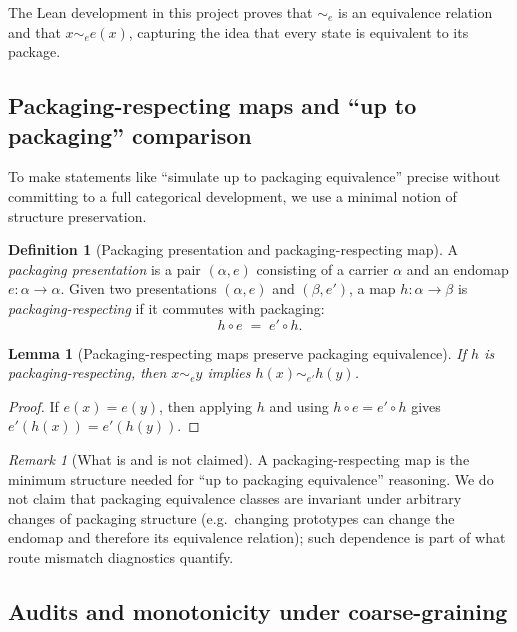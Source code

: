 \documentclass[11pt]{article}
\newtheorem{lemma}[theorem]{Lemma}
\theoremstyle{definition}
\newtheorem{definition}[theorem]{Definition}
\theoremstyle{remark}
\newtheorem{remark}[theorem]{Remark}
\begin{document}
The Lean development in this project proves that $\sim_e$ is an equivalence relation and that $x\sim_e e(x)$, capturing the idea that every state is equivalent to its package.

\subsection{Packaging-respecting maps and ``up to packaging'' comparison}
\label{sec:def-pack-morphisms}

To make statements like ``simulate up to packaging equivalence'' precise without committing to a full categorical development, we use a minimal notion of structure preservation.

\begin{definition}[Packaging presentation and packaging-respecting map]
\label{def:pack-morphism}
A \emph{packaging presentation} is a pair $(\alpha,e)$ consisting of a carrier $\alpha$ and an endomap $e:\alpha\to\alpha$.
Given two presentations $(\alpha,e)$ and $(\beta,e')$, a map $h:\alpha\to\beta$ is \emph{packaging-respecting} if it commutes with packaging:
\[
h\circ e \;=\; e'\circ h.
\]
\end{definition}

\begin{lemma}[Packaging-respecting maps preserve packaging equivalence]
\label{lem:pack-morphism-preserves}
If $h$ is packaging-respecting, then $x\sim_e y$ implies $h(x)\sim_{e'} h(y)$.
\end{lemma}

\begin{proof}
If $e(x)=e(y)$, then applying $h$ and using $h\circ e = e'\circ h$ gives $e'(h(x))=e'(h(y))$.
\end{proof}

\begin{remark}[What is and is not claimed]
A packaging-respecting map is the minimum structure needed for ``up to packaging equivalence'' reasoning.
We do not claim that packaging equivalence classes are invariant under arbitrary changes of packaging structure (e.g.\ changing prototypes can change the endomap and therefore its equivalence relation); such dependence is part of what route mismatch diagnostics quantify.
\end{remark}

\subsection{Audits and monotonicity under coarse-graining}
\label{sec:def-audits}
\end{document}
